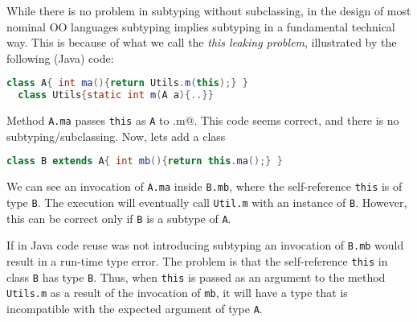 While there is no problem in subtyping without subclassing, in the design
of most nominal OO languages subtyping implies subtyping in a
fundamental technical way. This is because of what we call the
\emph{this leaking problem}, illustrated by the following
(Java) code:

\begin{lstlisting}[language=Java]
  class A{ int ma(){return Utils.m(this);} }
  class Utils{static int m(A a){..}}
\end{lstlisting}

Method \lstinline{A.ma} passes \lstinline{this} as \lstinline{A} to \Q@Util.m@.
This code seems correct, and there is no subtyping/subclassing.
Now, lets add a class \Q@B@

\begin{lstlisting}[language=Java]
  class B extends A{ int mb(){return this.ma();} }  
\end{lstlisting}

We can see an invocation of \lstinline{A.ma} inside
\lstinline{B.mb}, where the self-reference \lstinline{this} is of type \lstinline{B}. 
The execution will eventually call \lstinline{Util.m} with an
instance of \lstinline{B}. However, this can be correct only if \lstinline{B} is a subtype of
\lstinline{A}. 

%
%

If in Java code reuse was not introducing subtyping an invocation of 
\lstinline{B.mb} would result in a run-time type error.
The problem is that the
self-reference \lstinline{this} in class \lstinline{B} has 
type \lstinline{B}. Thus, when \lstinline{this} is passed as an argument to 
the method \lstinline{Utils.m} as a result of the invocation of
\lstinline{mb}, it will have a type that is incompatible with the
expected argument of type \lstinline{A}.  




